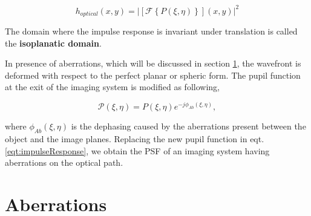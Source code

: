 \begin{equation}
h_{optical}(x,y) = |\left[\mathcal{F}\left\lbrace P(\xi,\eta) \right\rbrace\right](x,y)|^2
\label{eqt:impulseResponse}
\end{equation}

The domain where the impulse response is invariant under translation is called the \textbf{isoplanatic domain}.

In presence of aberrations, which will be discussed in section \ref{sec:Aberrations}, the wavefront is deformed with respect to the perfect planar or spheric form. The pupil function at the exit of the imaging system is modified as following,

\begin{equation}
\mathcal{P}(\xi,\eta) = P(\xi,\eta) e^{-j\phi_{Ab}(\xi,\eta)},
\label{eqt:aberratedPhasor}
\end{equation}

where $\phi_{Ab}(\xi,\eta)$ is the dephasing caused by the aberrations present between the object and the image planes. Replacing the new pupil function in eqt. \eqref{eqt:impulseResponse}, we obtain the PSF of an imaging system having aberrations on the optical path.

\section{Aberrations}
\label{sec:Aberrations}

